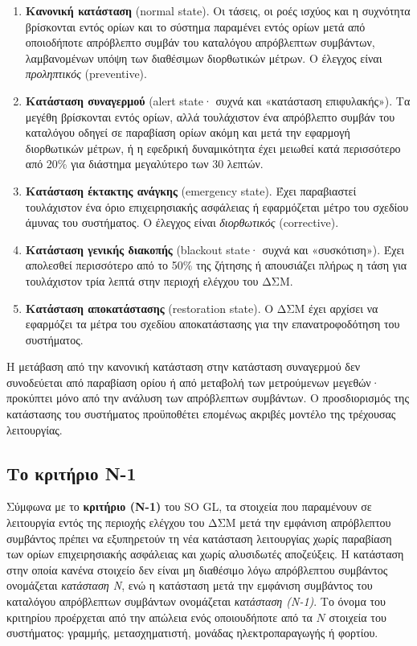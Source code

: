 \begin{enumerate}
\item \textbf{Κανονική κατάσταση} (normal state). Οι τάσεις, οι ροές ισχύος και η συχνότητα
      βρίσκονται εντός ορίων και το σύστημα παραμένει εντός ορίων μετά από οποιοδήποτε
      απρόβλεπτο συμβάν του καταλόγου απρόβλεπτων συμβάντων, λαμβανομένων υπόψη των
      διαθέσιμων διορθωτικών μέτρων. Ο έλεγχος είναι \emph{προληπτικός} (preventive).
\item \textbf{Κατάσταση συναγερμού} (alert state· συχνά και «κατάσταση επιφυλακής»). Τα
      μεγέθη βρίσκονται εντός ορίων, αλλά τουλάχιστον ένα απρόβλεπτο συμβάν του καταλόγου
      οδηγεί σε παραβίαση ορίων ακόμη και μετά την εφαρμογή διορθωτικών μέτρων, ή η
      εφεδρική δυναμικότητα έχει μειωθεί κατά περισσότερο από 20\% για διάστημα
      μεγαλύτερο των 30 λεπτών.
\item \textbf{Κατάσταση έκτακτης ανάγκης} (emergency state). Έχει παραβιαστεί τουλάχιστον
      ένα όριο επιχειρησιακής ασφάλειας ή εφαρμόζεται μέτρο του σχεδίου άμυνας του
      συστήματος. Ο έλεγχος είναι \emph{διορθωτικός} (corrective).
\item \textbf{Κατάσταση γενικής διακοπής} (blackout state· συχνά και «συσκότιση»). Έχει
      απολεσθεί περισσότερο από το 50\% της ζήτησης ή απουσιάζει πλήρως η τάση για
      τουλάχιστον τρία λεπτά στην περιοχή ελέγχου του ΔΣΜ.
\item \textbf{Κατάσταση αποκατάστασης} (restoration state). Ο ΔΣΜ έχει αρχίσει να
      εφαρμόζει τα μέτρα του σχεδίου αποκατάστασης για την επανατροφοδότηση του
      συστήματος.
\end{enumerate}

Η μετάβαση από την κανονική κατάσταση στην κατάσταση συναγερμού δεν συνοδεύεται από
παραβίαση ορίου ή από μεταβολή των μετρούμενων μεγεθών· προκύπτει μόνο από την ανάλυση
των απρόβλεπτων συμβάντων. Ο προσδιορισμός της κατάστασης του συστήματος προϋποθέτει
επομένως ακριβές μοντέλο της τρέχουσας λειτουργίας.

\subsection{Το κριτήριο N-1}
\label{sec:n1}

Σύμφωνα με το \textbf{κριτήριο (N-1)} του SO GL, τα στοιχεία που παραμένουν σε λειτουργία
εντός της περιοχής ελέγχου του ΔΣΜ μετά την εμφάνιση απρόβλεπτου συμβάντος πρέπει να
εξυπηρετούν τη νέα κατάσταση λειτουργίας χωρίς παραβίαση των ορίων επιχειρησιακής ασφάλειας
και χωρίς αλυσιδωτές αποζεύξεις. Η κατάσταση στην οποία κανένα στοιχείο δεν είναι μη
διαθέσιμο λόγω απρόβλεπτου συμβάντος ονομάζεται \emph{κατάσταση N}, ενώ η κατάσταση μετά την
εμφάνιση συμβάντος του καταλόγου απρόβλεπτων συμβάντων ονομάζεται \emph{κατάσταση (N-1)}. Το
όνομα του κριτηρίου προέρχεται από την απώλεια ενός οποιουδήποτε από τα $N$ στοιχεία του
συστήματος: γραμμής, μετασχηματιστή, μονάδας ηλεκτροπαραγωγής ή φορτίου.

